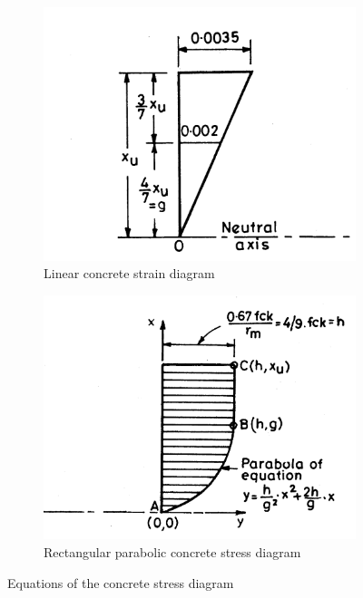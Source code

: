 \begin{figure}
\begin{subfigure}{0.5\textwidth}
\centering
\includegraphics[width=\textwidth]{images/linear.png}
\caption{Linear concrete strain diagram}
\label{fig:linear}
\end{subfigure}
%
\begin{subfigure}{0.5\textwidth}
\centering
\includegraphics[width=\textwidth]{images/parabolic.png}
\caption{Rectangular parabolic concrete stress diagram}
\label{fig:parabolic}
\end{subfigure}
\caption{Equations of the concrete stress diagram}
\label{fig:equations}
\end{figure}

